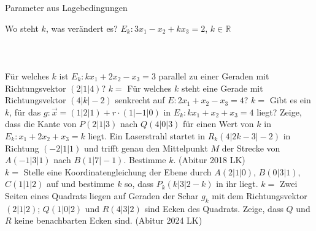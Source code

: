 \setcounter{aufgabe}{11}

\begin{aufgabe}{Parameter aus Lagebedingungen}
\begin{teile}
\teil Wo steht $k$, was verändert es? $E_k: 3x_1 - x_2 + k x_3 = 2$, $k \in \mathbb{R}$ \\  \\  \\  \\ 
\teil Für welches $k$ ist $E_k: k x_1 + 2x_2 - x_3 = 3$ parallel zu einer Geraden mit Richtungsvektor $(2 | 1 | 4)$? $k = $ \leerfeld
\teil Für welches $k$ steht eine Gerade mit Richtungsvektor $(4 | k | -2)$ senkrecht auf $E: 2x_1 + x_2 - x_3 = 4$? $k = $ \leerfeld
\teil Gibt es ein $k$, für das $g: \vec{x} = (1 | 2 | 1) + r \cdot (1 | -1 | 0)$ in $E_k: k x_1 + x_2 + x_3 = 4$ liegt?
\teil Zeige, dass die Kante von $P(2 | 1 | 3)$ nach $Q(4 | 0 | 3)$ für einen Wert von $k$ in $E_k: x_1 + 2x_2 + x_3 = k$ liegt.
\teil Ein Laserstrahl startet in $R_k(4 | 2k - 3 | -2)$ in Richtung $(-2 | 1 | 1)$ und trifft genau den Mittelpunkt $M$ der Strecke von $A(-1 | 3 | 1)$ nach $B(1 | 7 | -1)$. Bestimme $k$. \hfill (Abitur 2018 LK) \\ $k = $ \leerfeld
\teil Stelle eine Koordinatengleichung der Ebene durch $A(2 | 1 | 0)$, $B(0 | 3 | 1)$, $C(1 | 1 | 2)$ auf und bestimme $k$ so, dass $P_k(k | 3 | 2 - k)$ in ihr liegt. $k = $ \leerfeld
\teil Zwei Seiten eines Quadrats liegen auf Geraden der Schar $g_k$ mit dem Richtungsvektor $(2 | 1 | 2)$; $Q(1 | 0 | 2)$ und $R(4 | 3 | 2)$ sind Ecken des Quadrats. Zeige, dass $Q$ und $R$ keine benachbarten Ecken sind. \hfill (Abitur 2024 LK)
\end{teile}
\end{aufgabe}

